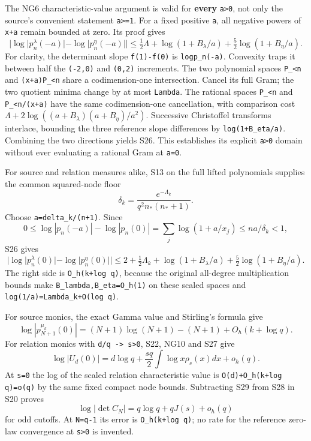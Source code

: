 \documentclass[11pt]{article}
\begin{document}
The NG6 characteristic-value argument is valid for \textbf{every} \texttt{a\textgreater{}0}, not only the source's convenient statement \texttt{a\textgreater{}=1}. For a fixed positive \texttt{a}, all negative powers of \texttt{x+a} remain bounded at zero. Its proof gives \[
 |\log|p_n^\lambda(-a)|-\log|p_n^\eta(-a)||
 \le\tfrac12\Lambda+\log(1+B_\lambda/a)
                   +\tfrac52\log(1+B_\eta/a).                    \tag{S26}
\] For clarity, the determinant slope \texttt{f(1)-f(0)} is \texttt{log\textbar{}p\_n(-a)\textbar{}}. Convexity traps it between half the \texttt{(-2,0)} and \texttt{(0,2)} increments. The two polynomial spaces \texttt{P\_\textless{}n} and \texttt{(x+a)P\_\textless{}n} share a codimension-one intersection. Cancel its full Gram; the two quotient minima change by at most \texttt{Lambda}. The rational spaces \texttt{P\_\textless{}n} and \texttt{P\_\textless{}n/(x+a)} have the same codimension-one cancellation, with comparison cost \(\Lambda+2\log((a+B_\lambda)(a+B_\eta)/a^2)\). Successive Christoffel transforms interlace, bounding the three reference slope differences by \texttt{log(1+B\_eta/a)}. Combining the two directions yields S26. This establishes its explicit \texttt{a\textgreater{}0} domain without ever evaluating a rational Gram at \texttt{a=0}.

For source and relation measures alike, S13 on the full lifted polynomials supplies the common squared-node floor \[
 \delta_k=\frac{e^{-\Lambda_k}}{q^2 n_*(n_*+1)}.
\] Choose \texttt{a=delta\_k/(n+1)}. Since \[
 0\le\log|p_n(-a)|-\log|p_n(0)|
 =\sum_j\log(1+a/x_j)\le n a/\delta_k<1,
\] S26 gives \[
 \boxed{|\log|p_n^\lambda(0)|-\log|p_n^\eta(0)||
 \le2+\tfrac12\Lambda_k+\log(1+B_\lambda/a)
                         +\tfrac52\log(1+B_\eta/a).}             \tag{S27}
\] The right side is \texttt{O\_h(k+log\ q)}, because the original all-degree multiplication bounds make \nolinkurl{B_lambda,B_eta=O_h(1)} on these scaled spaces and \nolinkurl{log(1/a)=Lambda_k+O(log q)}.

For source monics, the exact Gamma value and Stirling's formula give \[
 \log|p_{N+1}^{\mu_k}(0)|
 =(N+1)\log(N+1)-(N+1)+O_h(k+\log q).                             \tag{S28}
\] For relation monics with \texttt{d/q\ -\textgreater{}\ s\textgreater{}0}, S22, NG10 and S27 give \[
 \log|U_d(0)|=d\log q+\frac{sq}{2}\int\log x\rho_s(x)dx+o_h(q).    \tag{S29}
\] At \texttt{s=0} the log of the scaled relation characteristic value is \nolinkurl{O(d)+O_h(k+log q)=o(q)} by the same fixed compact node bounds. Subtracting S29 from S28 in S20 proves \[
 \boxed{\log|\det C_N|=q\log q+qJ(s)+o_h(q)}                      \tag{S30}
\] for odd cutoffs. At \texttt{N=q-1} its error is \texttt{O\_h(k+log\ q)}; no rate for the reference zero-law convergence at \texttt{s\textgreater{}0} is invented.
\end{document}
